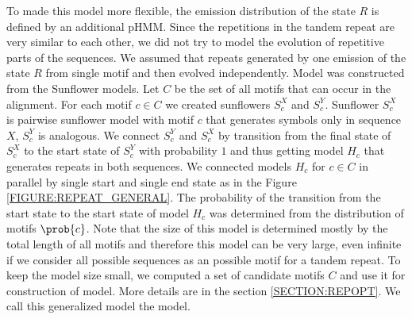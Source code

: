 To made this model more flexible, the emission distribution of the state $R$ is
defined by an additional pHMM. Since the repetitions in the tandem repeat are
very similar to each other, we did not try to model the evolution of repetitive
parts of the sequences. We assumed that repeats generated by one emission of
the state $R$ from single motif and then evolved independently. Model was
constructed from the Sunflower models. Let $C$ be the set of all motifs that
can occur in the alignment. For each motif $c\in C$ we created sunflowers
$S_c^X$ and $S_c^Y$.  Sunflower $S_c^X$ is pairwise sunflower model with motif
$c$ that generates symbols only in sequence $X$, $S_c^Y$ is analogous.  We
connect $S_c^Y$ and $S_c^X$ by transition from the final state of $S_c^X$ to
the start state of $S_c^Y$ with probability $1$ and thus getting model $H_c$
that generates repeats in both sequences. We connected models $H_c$ for $c\in
C$ in parallel by single start and single end state as in the Figure
\ref{FIGURE:REPEAT_GENERAL}. The probability of the transition from the start
state to the start state of model $H_c$ was determined from the distribution of
motifs $\prob{c}$. Note that the size of this model is determined mostly by the
total length of all motifs and therefore this model can be very large, even
infinite if we consider all possible sequences as an possible motif for a
tandem repeat.  To keep the model size small, we computed a set of candidate
motifs $C$ and use it for construction of model. More details are in the
section \ref{SECTION:REPOPT}. We call this generalized model the
 model.

